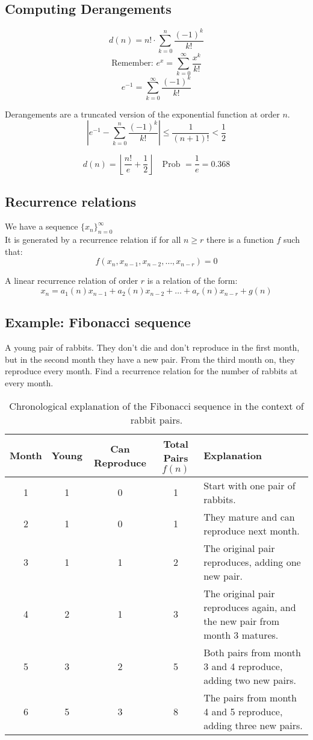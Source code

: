 \documentclass[11pt]{article}
\begin{document}
\subsection*{Computing Derangements}
\[
d(n) = n! \cdot \sum_{k=0}^{n} \frac{(-1)^k}{k!}
\]
\[
\text{Remember: } e^x = \sum_{k=0}^{\infty} \frac{x^k}{k!}
\]
\[
e^{-1} = \sum_{k=0}^{\infty} \frac{(-1)^k}{k!}
\]

Derangements are a truncated version of the exponential function at order $n$.
\[
\left| e^{-1} - \sum_{k=0}^{n} \frac{(-1)^k}{k!} \right| \leq \frac{1}{(n+1)!} < \frac{1}{2}
\]

\[
d(n) = \left\lfloor \frac{n!}{e} + \frac{1}{2} \right\rfloor \quad \text{Prob } = \frac{1}{e} = 0.368 
\]

\subsection{Recurrence relations}
We have a sequence $\{ x_n \}_{n = 0}^{\infty}$ \\
It is generated by a recurrence relation if for all $n \geq r$ there is a function $f$ such that:
\[
f(x_n, x_{n-1}, x_{n-2}, \dots, x_{n-r}) = 0
\]

A linear recurrence relation of order $r$ is a relation of the form:
\[
x_n = a_1(n) x_{n-1} + a_2(n) x_{n-2} + \dots + a_r(n) x_{n-r} + g(n)
\]

\subsection*{Example: Fibonacci sequence}
A young pair of rabbits. They don't die and don't reproduce in the first month, but in the second month they have a new pair. From the third month on, they reproduce every month. Find a recurrence relation for the number of rabbits at every month.

\begin{table}[!h]
\begin{tabular}{|c|c|c|c|p{5cm}|}
\hline
\textbf{Month} & \textbf{Young} & \textbf{Can Reproduce} & \textbf{Total Pairs} $f(n)$ & \textbf{Explanation} \\
\hline
1 & 1 & 0 & 1 & Start with one pair of rabbits. \\
2 & 1 & 0 & 1 & They mature and can reproduce next month. \\
3 & 1 & 1 & 2 & The original pair reproduces, adding one new pair. \\
4 & 2 & 1 & 3 & The original pair reproduces again, and the new pair from month 3 matures. \\
5 & 3 & 2 & 5 & Both pairs from month 3 and 4 reproduce, adding two new pairs. \\
6 & 5 & 3 & 8 & The pairs from month 4 and 5 reproduce, adding three new pairs. \\
\hline
\end{tabular}
\caption{Chronological explanation of the Fibonacci sequence in the context of rabbit pairs.}
\end{table}
\end{document}
